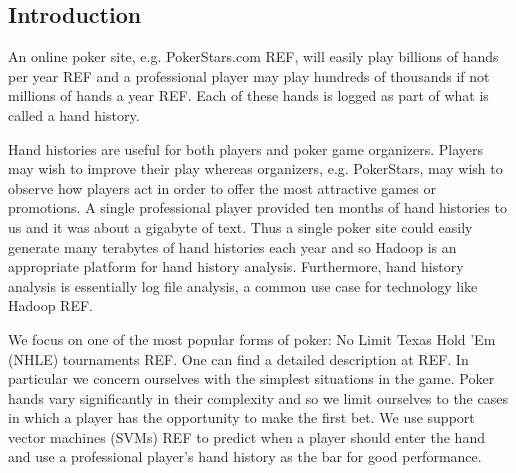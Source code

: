 \documentclass[twoside]{article}
\begin{document}
\begin{multicols}{2} %

\section{Introduction}
An online poker site, e.g. PokerStars.com REF, will easily play billions of hands per year REF and a professional player may play hundreds of thousands if not millions of hands a year REF. Each of these hands is logged as part of what is called a hand history.

Hand histories are useful for both players and poker game organizers. Players may wish to improve their play whereas organizers, e.g. PokerStars, may wish to observe how players act in order to offer the most attractive games or promotions. A single professional player provided ten months of hand histories to us and it was about a gigabyte of text. Thus a single poker site could easily generate many terabytes of hand histories each year and so Hadoop is an appropriate platform for hand history analysis. Furthermore, hand history analysis is essentially log file analysis, a common use case for technology like Hadoop REF.

We focus on one of the most popular forms of poker: No Limit Texas Hold 'Em (NHLE) tournaments REF. One can find a detailed description at REF. In particular we concern ourselves with the simplest situations in the game. Poker hands vary significantly in their complexity and so we limit ourselves to the cases in which a player has the opportunity to make the first bet. We use support vector machines (SVMs) REF to predict when a player should enter the hand and use a professional player's hand history as the bar for good performance.



\end{multicols}
\end{document}

